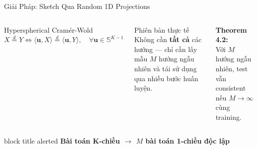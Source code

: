 \documentclass[aspectratio=169,11pt]{beamer}
\newcommand{\takeaway}[1]{%
  \vfill
  \begin{beamercolorbox}[sep=4pt,center,rounded=true]{block title alerted}
    \small\bfseries #1
  \end{beamercolorbox}%
}
\begin{document}
\begin{frame}{Giải Pháp: Sketch Qua Random 1D Projections}
\begin{columns}[c]
  \begin{alertblock}{Hyperspherical Cramér-Wold}
    \footnotesize
    $X \stackrel{d}{=} Y \iff \langle \mathbf{u}, X \rangle \stackrel{d}{=} \langle \mathbf{u}, Y \rangle, \quad \forall \mathbf{u} \in \mathbb{S}^{K-1}$
  \end{alertblock}
  \vspace{5pt}
  \begin{block}{Phiên bản thực tế}
    \footnotesize
    Không cần \textbf{tất cả} các hướng — chỉ cần lấy mẫu $M$ hướng ngẫu nhiên và tái sử dụng qua nhiều bước huấn luyện.
  \end{block}
  \vspace{5pt}
  \footnotesize
  \textbf{Theorem 4.2:}\\
  Với $M$ hướng ngẫu nhiên, test vẫn consistent nếu $M \to \infty$ cùng training.
\end{columns}
\takeaway{Bài toán K-chiều $\to$ $M$ bài toán 1-chiều độc lập}
\end{frame}
\end{document}
